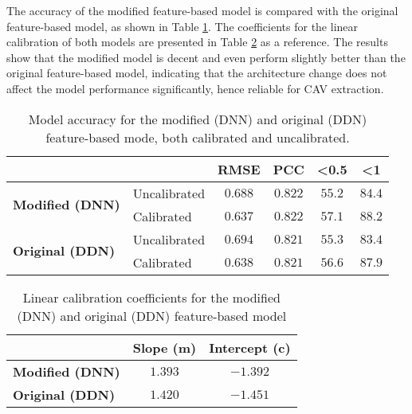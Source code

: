The accuracy of the modified feature-based model is compared with the original feature-based model, as shown in Table \ref{tab:model_accuracy_dnn_like}. The coefficients for the linear calibration of both models are presented in Table \ref{tab:linear_regression_coefficients_dnn_like} as a reference. The results show that the modified model is decent and even perform slightly better than the original feature-based model, indicating that the architecture change does not affect the model performance significantly, hence reliable for CAV extraction.

\begin{table}[H]
    \centering
    \begin{tabular}{|l|l|c|c|c|c|}
        \hline
        \multicolumn{2}{|l|}{\textbf{}} & \textbf{RMSE} & \textbf{PCC} & \textbf{\textless 0.5} & \textbf{\textless 1}          \\ \hline
        \multirow{2}{*}{\textbf{Modified (DNN)}}
                                        & Uncalibrated  & $0.688$      & $0.822$                & $55.2$               & $84.4$ \\ \cline{2-6}
                                        & Calibrated    & $0.637$      & $0.822$                & $57.1$               & $88.2$ \\ \hline
        \multirow{2}{*}{\textbf{Original (DDN)}}
                                        & Uncalibrated  & $0.694$      & $0.821$                & $55.3$               & $83.4$ \\ \cline{2-6}
                                        & Calibrated    & $0.638$      & $0.821$                & $56.6$               & $87.9$ \\ \hline
    \end{tabular}
    \caption{Model accuracy for the modified (DNN) and original (DDN) feature-based mode, both calibrated and uncalibrated.}
    \label{tab:model_accuracy_dnn_like}
\end{table}


\begin{table}[H]
    \centering
    \begin{tabular}{|l|c|c|}
        \hline
        \textbf{}               & \textbf{Slope (m)} & \textbf{Intercept (c)} \\ \hline
        \textbf{Modified (DNN)} & $1.393$            & $-1.392$               \\ \hline
        \textbf{Original (DDN)} & $1.420$            & $-1.451$               \\ \hline
    \end{tabular}
    \caption{Linear calibration coefficients for the modified (DNN) and original (DDN) feature-based model}
    \label{tab:linear_regression_coefficients_dnn_like}
\end{table}

